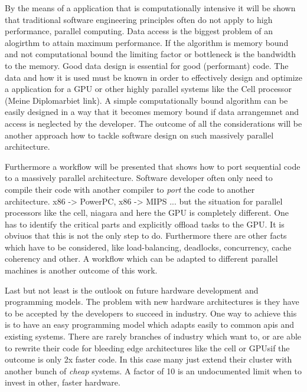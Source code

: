 By the means of a application that is computationally intensive it will be shown
that traditional software engineering principles often do not apply to high
performance, parallel computing. Data access is the biggest problem of an
alogirthm to attain maximum performance. If the algorithm is memory bound and
not computational bound the limiting factor or bottleneck is the bandwidth to
the memory. Good data design is essential for good (performant) code. The data
and how it is used must be known in order to effectively design and optimize a
application for a \gls{GPU} or other highly parallel systems like the Cell processor
(Meine Diplomarbiet link). A simple computationally bound algorithm can be
easily designed in a way that it becomes memory bound if data arrangemnet and
access is neglected by the developer. The outcome of all the considerations will
be another approach how to tackle software design on such massively parallel
architecture.

Furthermore a workflow will be presented that shows how to port sequential code
to a massively parallel architecture. Software developer often only need to
compile their code with another compiler to \emph{port} the code to another
architecture. x86 -> PowerPC, x86 -> MIPS ... but the situation for parallel
processors like the cell, niagara and here the \gls{GPU} is completely different. One
has to identify the critical parts and explicitly offload tasks to the GPU. It
is obviuos that this is not the only step to do. Furthermore there are other
facts which have to be considered, like load-balancing, deadlocks, concurrency,
cache coherency and other. A workflow which can be adapted to different parallel
machines is another outcome of this work.

Last but not least is the outlook on future hardware development and programming
models. The problem with new hardware architectures is they have to be accepted
by the developers to succeed in industry. One way to achieve this is to have an
easy programming model which adapts easily to common apis and existing systems.
There are rarely branches of industry which want to, or are able to rewrite
their code for bleeding edge architectures like the cell or \glspl{GPU}if the outcome
is only 2x faster code. In this case many just extend their cluster with another
bunch of \emph{cheap} systems. A factor of 10 is an undocumented limit when to
invest in other, faster hardware.

